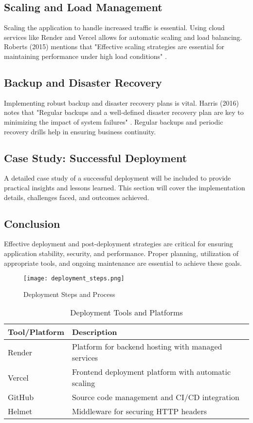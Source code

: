 \subsection{Scaling and Load Management}
Scaling the application to handle increased traffic is essential. Using cloud services like Render and Vercel allows for automatic scaling and load balancing. Roberts (2015) mentions that "Effective scaling strategies are essential for maintaining performance under high load conditions" \cite{roberts2015scaling}.

\subsection{Backup and Disaster Recovery}
Implementing robust backup and disaster recovery plans is vital. Harris (2016) notes that "Regular backups and a well-defined disaster recovery plan are key to minimizing the impact of system failures" \cite{harris2016backup}. Regular backups and periodic recovery drills help in ensuring business continuity.

\subsection{Case Study: Successful Deployment}
A detailed case study of a successful deployment will be included to provide practical insights and lessons learned. This section will cover the implementation details, challenges faced, and outcomes achieved.

\subsection{Conclusion}
Effective deployment and post-deployment strategies are critical for ensuring application stability, security, and performance. Proper planning, utilization of appropriate tools, and ongoing maintenance are essential to achieve these goals.

\begin{figure}[h]
    \centering
    \texttt{[image: deployment\_steps.png]}
    \caption{Deployment Steps and Process}
    \label{fig:deployment_steps}
\end{figure}

\begin{table}[h]
    \centering
    \begin{tabular}{|l|l|}
        \hline
        \textbf{Tool/Platform} & \textbf{Description} \\
        \hline
        Render & Platform for backend hosting with managed services \\
        Vercel & Frontend deployment platform with automatic scaling \\
        GitHub & Source code management and CI/CD integration \\
        Helmet & Middleware for securing HTTP headers \\
        \hline
    \end{tabular}
    \caption{Deployment Tools and Platforms}
    \label{tab:deployment_tools}
\end{table}